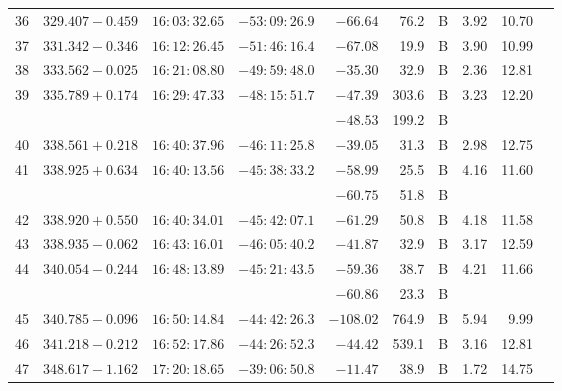 {\begin{longtable}{l lll r r c rrr}
36   &  $329.407-0.459$   &  $16:03:32.65$    & $-53:09:26.9$    & $ -66.64 $ &    76.2&       B    &    3.92  &   10.70   &           \\
37   &  $331.342-0.346$   &  $16:12:26.45$    & $-51:46:16.4$    & $ -67.08 $ &    19.9&       B    &    3.90  &   10.99   &           \\
38   &  $333.562-0.025$   &  $16:21:08.80$    & $-49:59:48.0$    & $ -35.30 $ &    32.9&       B    &    2.36  &   12.81   &           \\
39   &  $335.789+0.174$   &  $16:29:47.33$    & $-48:15:51.7$    & $ -47.39 $ &   303.6&       B    &    3.23  &   12.20   &           \\
     &  $             $   &  $           $    & $           $    & $ -48.53 $ &   199.2&       B    &          &           &           \\
40   &  $338.561+0.218$   &  $16:40:37.96$    & $-46:11:25.8$    & $ -39.05 $ &    31.3&       B    &    2.98  &   12.75   &           \\
41   &  $338.925+0.634$   &  $16:40:13.56$    & $-45:38:33.2$    & $ -58.99 $ &    25.5&       B    &    4.16  &   11.60   &           \\
     &  $             $   &  $           $    & $           $    & $ -60.75 $ &    51.8&       B    &          &           &           \\
42   &  $338.920+0.550$   &  $16:40:34.01$    & $-45:42:07.1$    & $ -61.29 $ &    50.8&       B    &    4.18  &   11.58   &           \\
43   &  $338.935-0.062$   &  $16:43:16.01$    & $-46:05:40.2$    & $ -41.87 $ &    32.9&       B    &    3.17  &   12.59   &           \\
44   &  $340.054-0.244$   &  $16:48:13.89$    & $-45:21:43.5$    & $ -59.36 $ &    38.7&       B    &    4.21  &   11.66   &           \\
     &  $             $   &  $           $    & $           $    & $ -60.86 $ &    23.3&       B    &          &           &           \\
45   &  $340.785-0.096$   &  $16:50:14.84$    & $-44:42:26.3$    & $-108.02 $ &   764.9&       B    &    5.94  &    9.99   &           \\
46   &  $341.218-0.212$   &  $16:52:17.86$    & $-44:26:52.3$    & $ -44.42 $ &   539.1&       B    &    3.16  &   12.81   &           \\
47   &  $348.617-1.162$   &  $17:20:18.65$    & $-39:06:50.8$    & $ -11.47 $ &    38.9&       B    &    1.72  &   14.75   &           \\

\end{longtable}}
